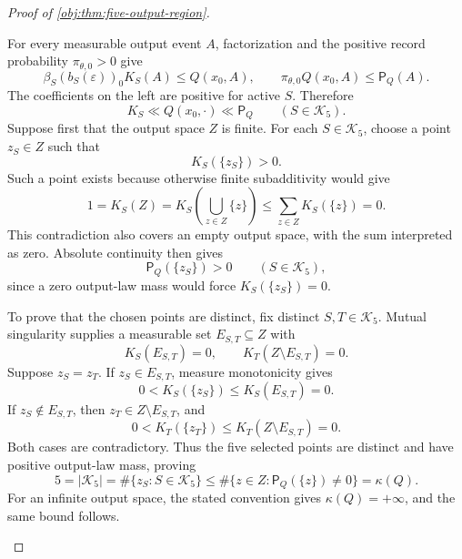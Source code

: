 \documentclass[11pt]{article}
\begin{document}
\begin{proof}[Proof of \cref{obj:thm:five-output-region}]
\begin{enumerate}
For every measurable output event \(A\), factorization
and the positive record probability \(\pi_{\theta,0}>0\) give
\[
\beta_S(b_S(\varepsilon))_0K_S(A)\le Q(x_0,A),
\qquad
\pi_{\theta,0}Q(x_0,A)\le\mathsf P_Q(A).
\]
The coefficients on the left are positive for active \(S\). Therefore
\[
K_S\ll Q(x_0,\cdot)\ll\mathsf P_Q
\qquad(S\in\mathcal K_5).
\]
Suppose first that the output space \(Z\) is finite. For each
\(S\in\mathcal K_5\), choose a point \(z_S\in Z\) such that
\[
K_S(\{z_S\})>0.
\]
Such a point exists because otherwise finite subadditivity would give
\[
1=K_S(Z)
=K_S\!\left(\bigcup_{z\in Z}\{z\}\right)
\le\sum_{z\in Z}K_S(\{z\})=0.
\]
This contradiction also covers an empty output space, with the sum
interpreted as zero. Absolute continuity then gives
\[
\mathsf P_Q(\{z_S\})>0\qquad(S\in\mathcal K_5),
\]
since a zero output-law mass would force \(K_S(\{z_S\})=0\).

To prove that the chosen points are distinct, fix distinct
\(S,T\in\mathcal K_5\). Mutual singularity supplies a measurable set
\(E_{S,T}\subseteq Z\) with
\[
K_S(E_{S,T})=0,\qquad K_T(Z\setminus E_{S,T})=0.
\]
Suppose \(z_S=z_T\). If \(z_S\in E_{S,T}\), measure monotonicity gives
\[
0<K_S(\{z_S\})\le K_S(E_{S,T})=0.
\]
If \(z_S\notin E_{S,T}\), then \(z_T\in Z\setminus E_{S,T}\), and
\[
0<K_T(\{z_T\})\le K_T(Z\setminus E_{S,T})=0.
\]
Both cases are contradictory. Thus the five selected points are distinct
and have positive output-law mass, proving
\[
5=|\mathcal K_5|
=\#\{z_S:S\in\mathcal K_5\}
\le
\#\{z\in Z:\mathsf P_Q(\{z\})\ne0\}
=\kappa(Q).
\]
For an infinite output space, the stated convention gives
\(\kappa(Q)=+\infty\), and the same bound follows.


\end{enumerate}
\end{proof}
\end{document}
